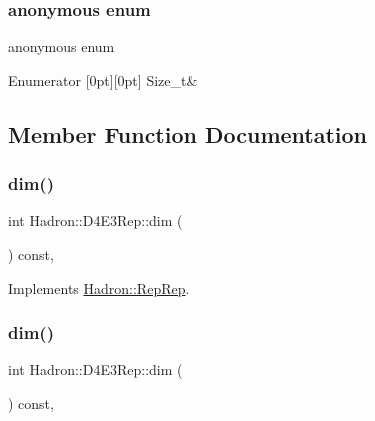 \subsubsection{\texorpdfstring{anonymous enum}{anonymous enum}}
{\footnotesize\ttfamily anonymous enum}

\begin{DoxyEnumFields}{Enumerator}
[0pt][0pt]{}\mbox{\label{structHadron_1_1D4E3Rep_a8edcde67a78c2b73513adceb67058523a6c44230a5c0ef19eb4efb48ead792533}} 
Size\+\_\+t&\\
\hline

\end{DoxyEnumFields}


\subsection{Member Function Documentation}
\mbox{\label{structHadron_1_1D4E3Rep_a7e048ba087ccbf5ddfade8be991509a0}} 
\subsubsection{\texorpdfstring{dim()}{dim()}\hspace{0.1cm}{\footnotesize\ttfamily [1/5]}}
{\footnotesize\ttfamily int Hadron\+::\+D4\+E3\+Rep\+::dim (\begin{DoxyParamCaption}{ }\end{DoxyParamCaption}) const\hspace{0.3cm}{\ttfamily [inline]}, {\ttfamily [virtual]}}



Implements \mbox{\hyperlink{structHadron_1_1RepRep_a92c8802e5ed7afd7da43ccfd5b7cd92b}{Hadron\+::\+Rep\+Rep}}.

\mbox{\label{structHadron_1_1D4E3Rep_a7e048ba087ccbf5ddfade8be991509a0}} 
\subsubsection{\texorpdfstring{dim()}{dim()}\hspace{0.1cm}{\footnotesize\ttfamily [2/5]}}
{\footnotesize\ttfamily int Hadron\+::\+D4\+E3\+Rep\+::dim (\begin{DoxyParamCaption}{ }\end{DoxyParamCaption}) const\hspace{0.3cm}{\ttfamily [inline]}, {\ttfamily [virtual]}}



